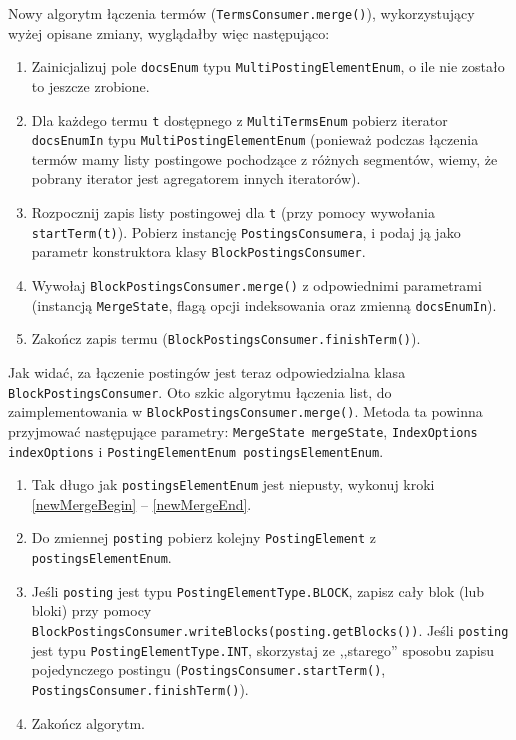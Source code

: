 Nowy algorytm łączenia termów (\texttt{TermsConsumer.merge()}), wykorzystujący wyżej opisane zmiany, wyglądałby więc następująco:
\begin{enumerate}
 \item Zainicjalizuj pole \texttt{docsEnum} typu \texttt{MultiPostingElementEnum}, o ile nie zostało to jeszcze zrobione.
 \item Dla każdego termu \texttt{t} dostępnego z \texttt{MultiTermsEnum} pobierz iterator \texttt{docsEnumIn} typu \texttt{MultiPostingElementEnum} (ponieważ podczas łączenia termów mamy listy postingowe pochodzące z różnych segmentów, wiemy, że pobrany iterator jest agregatorem innych iteratorów).
 \item Rozpocznij zapis listy postingowej dla \texttt{t} (przy pomocy wywołania \texttt{startTerm(t)}). Pobierz instancję \texttt{PostingsConsumera}, i podaj ją jako parametr konstruktora klasy \texttt{BlockPostingsConsumer}.
 \item Wywołaj \texttt{BlockPostingsConsumer.merge()} z odpowiednimi parametrami (instancją \texttt{MergeState}, flagą opcji indeksowania oraz zmienną \texttt{docsEnumIn}).
 \item Zakończ zapis termu (\texttt{BlockPostingsConsumer.finishTerm()}).
\end{enumerate}

Jak widać, za łączenie postingów jest teraz odpowiedzialna klasa \texttt{BlockPostingsConsumer}. Oto szkic algorytmu łączenia list, do zaimplementowania w \texttt{BlockPostingsConsumer.merge()}. Metoda ta powinna przyjmować następujące parametry: \texttt{MergeState mergeState}, \texttt{IndexOptions indexOptions} i \texttt{PostingElementEnum postingsElementEnum}.
\begin{enumerate}
 \item Tak długo jak \texttt{postingsElementEnum} jest niepusty, wykonuj kroki \ref{newMergeBegin} -- \ref{newMergeEnd}.
 \item \label{newMergeBegin} Do zmiennej \texttt{posting} pobierz kolejny \texttt{PostingElement} z \texttt{postingsElementEnum}.
 \item \label{newMergeEnd} Jeśli \texttt{posting} jest typu \texttt{PostingElementType.BLOCK}, zapisz cały blok (lub bloki) przy pomocy \texttt{BlockPostingsConsumer.writeBlocks(posting.getBlocks())}. Jeśli \texttt{posting} jest typu \texttt{PostingElementType.INT}, skorzystaj ze ,,starego'' sposobu zapisu pojedynczego postingu (\texttt{PostingsConsumer.startTerm()}, \texttt{PostingsConsumer.finishTerm()}).
 \item Zakończ algorytm.
\end{enumerate}


